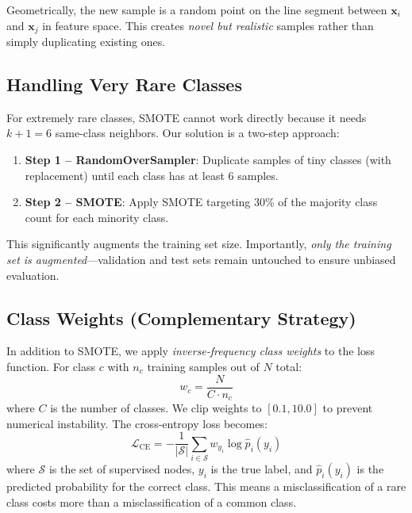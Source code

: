 \documentclass[conference]{IEEEtran}
\newcommand{\Loss}{\mathcal{L}}
\newcommand{\vect}[1]{\bm{#1}}
\DeclareMathOperator{\CE}{CE}
\begin{document}
Geometrically, the new sample is a random point on the line segment between $\vect{x}_i$ and $\vect{x}_j$ in feature space. This creates \emph{novel but realistic} samples rather than simply duplicating existing ones.

\subsection{Handling Very Rare Classes}

For extremely rare classes, SMOTE cannot work directly because it needs $k+1 = 6$ same-class neighbors. Our solution is a two-step approach:

\begin{enumerate}
    \item \textbf{Step 1 -- RandomOverSampler}: Duplicate samples of tiny classes (with replacement) until each class has at least 6 samples.
    \item \textbf{Step 2 -- SMOTE}: Apply SMOTE targeting 30\% of the majority class count for each minority class.
\end{enumerate}

This significantly augments the training set size. Importantly, \emph{only the training set is augmented}---validation and test sets remain untouched to ensure unbiased evaluation.

\subsection{Class Weights (Complementary Strategy)}

In addition to SMOTE, we apply \emph{inverse-frequency class weights} to the loss function. For class $c$ with $n_c$ training samples out of $N$ total:
\begin{equation}
    w_c = \frac{N}{C \cdot n_c}
\end{equation}
where $C$ is the number of classes. We clip weights to $[0.1, 10.0]$ to prevent numerical instability. The cross-entropy loss becomes:
\begin{equation}
    \Loss_{\CE} = -\frac{1}{|\mathcal{S}|} \sum_{i \in \mathcal{S}} w_{y_i} \log \hat{p}_i(y_i)
\end{equation}
where $\mathcal{S}$ is the set of supervised nodes, $y_i$ is the true label, and $\hat{p}_i(y_i)$ is the predicted probability for the correct class. This means a misclassification of a rare class costs more than a misclassification of a common class.

\end{document}
